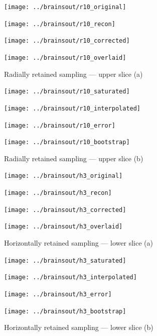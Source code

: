 \documentclass[article]{jdssv}
\begin{document}
\begin{figure}
\begin{centering}

\parbox{\imsizes}{\texttt{[image: ../brainsout/r10\_original]}}
\hfill
\parbox{\imsizes}{\texttt{[image: ../brainsout/r10\_recon]}}

\vspace{\vertsep}

\parbox{\imsizes}{\texttt{[image: ../brainsout/r10\_corrected]}}
\hfill
\parbox{\imsizes}{\texttt{[image: ../brainsout/r10\_overlaid]}}

\end{centering}
\caption{Radially retained sampling --- upper slice (a)}
\end{figure}


\begin{figure}
\begin{centering}

\parbox{\imsizes}{\texttt{[image: ../brainsout/r10\_saturated]}}
\hfill
\parbox{\imsizes}{\texttt{[image: ../brainsout/r10\_interpolated]}}

\vspace{\vertsep}

\parbox{\imsizes}{\texttt{[image: ../brainsout/r10\_error]}}
\hfill
\parbox{\imsizes}{\texttt{[image: ../brainsout/r10\_bootstrap]}}

\end{centering}
\caption{Radially retained sampling --- upper slice (b)}
\end{figure}


\begin{figure}
\begin{centering}

\parbox{\imsizes}{\texttt{[image: ../brainsout/h3\_original]}}
\hfill
\parbox{\imsizes}{\texttt{[image: ../brainsout/h3\_recon]}}

\vspace{\vertsep}

\parbox{\imsizes}{\texttt{[image: ../brainsout/h3\_corrected]}}
\hfill
\parbox{\imsizes}{\texttt{[image: ../brainsout/h3\_overlaid]}}

\end{centering}
\caption{Horizontally retained sampling --- lower slice (a)}
\end{figure}


\begin{figure}
\begin{centering}

\parbox{\imsizes}{\texttt{[image: ../brainsout/h3\_saturated]}}
\hfill
\parbox{\imsizes}{\texttt{[image: ../brainsout/h3\_interpolated]}}

\vspace{\vertsep}

\parbox{\imsizes}{\texttt{[image: ../brainsout/h3\_error]}}
\hfill
\parbox{\imsizes}{\texttt{[image: ../brainsout/h3\_bootstrap]}}

\end{centering}
\caption{Horizontally retained sampling --- lower slice (b)}
\end{figure}
\end{document}
